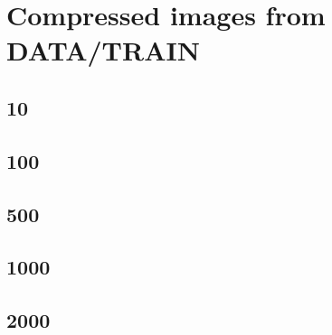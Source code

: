\documentclass{article}
\begin{document}
\section{Compressed images from DATA/TRAIN}
\subsection{10}
\subsection{100}
\subsection{500}
\subsection{1000}
\subsection{2000}




\end{document}
